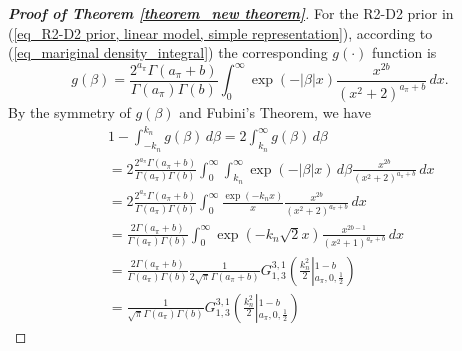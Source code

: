 \documentclass[12pt]{article}
\begin{document}
\begin{proof} [\textbf{Proof of Theorem \ref{theorem_new theorem}}]
	For the R2-D2 prior in (\ref{eq_R2-D2 prior, linear model, simple representation}),  according to (\ref{eq_mariginal density_integral}) the corresponding $g(\cdot)$ function is
	\[
	g(\beta)  = \frac{2^{a_{\pi}}\Gamma(a_{\pi}+b)}{\Gamma(a_{\pi})\Gamma(b)}   \int_{ 0}^\infty   \exp (- |\beta|x )\frac{x^{ 2b}}{(x^2+2)^{a_{\pi}+b}}  \, dx .
	\]
	By the symmetry of $g(\beta)$ and Fubini's Theorem, we have
	\begin{eqnarray*}
		&& 1 - \int_{-k_n}^{k_n} g(\beta)\, d\beta = 2\int_{k_n}^{\infty} g(\beta)\, d\beta  \\
		&& =   2 \frac{2^{a_{\pi}}\Gamma(a_{\pi}+b)}{\Gamma(a_{\pi})\Gamma(b)}    \int_{ 0}^\infty    \int_{k_n}^{\infty}   \exp (- |\beta|x )  \, d\beta   \frac{x^{ 2b}}{(x^2+2)^{a_{\pi}+b}}  \, dx  \\
		&& =   2 \frac{2^{a_{\pi}}\Gamma(a_{\pi}+b)}{\Gamma(a_{\pi})\Gamma(b)}    \int_{ 0}^\infty    \frac{ \exp (- k_n x )}{x}   \frac{x^{ 2b}}{(x^2+2)^{a_{\pi}+b}}  \, dx  \\
		&& =      \frac{2 \Gamma(a_{\pi}+b)}{\Gamma(a_{\pi})\Gamma(b)}      \int_{ 0}^\infty     { \exp (- k_n \sqrt{2}x )}     \frac{x^{2b-1}}{(x^2 +1)^{a_{\pi}+b}}  \, dx  \\
		&& =   \frac{2 \Gamma(a_{\pi}+b)}{\Gamma(a_{\pi})\Gamma(b)}    \frac{1}{2\sqrt{\pi} \Gamma(a_{\pi} +b)} G_{1,3}^{3,1}\left(\frac{k_n^2}{2}
		\left\vert ^{1-b}_{a_{\pi}, 0, \frac{1}{2}} \right. \right)   \\
		&& =   \frac{1}{\sqrt{\pi}\Gamma(a_{\pi})\Gamma(b)}   G_{1,3}^{3,1}\left(\frac{k_n^2}{2}
		\left\vert ^{1-b}_{a_{\pi}, 0, \frac{1}{2}} \right. \right)

\end{eqnarray*}
\end{proof}
\end{document}
